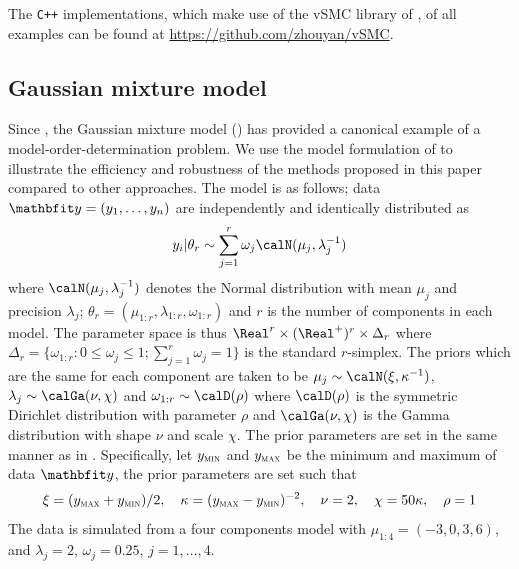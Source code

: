 The \texttt{C++} implementations, which make use of the vSMC library of
\cite{vsmcjss}, of all examples can be found at
\url{https://github.com/zhouyan/vSMC}.

\subsection{Gaussian mixture model}
\label{sub:Gaussian mixture model}

Since \cite{Richardson:1997ea}, the Gaussian mixture model (\gmm) has
provided a canonical example of a model-order-determination problem. We use
the model formulation of \cite{DelMoral:2006hc} to illustrate the efficiency
and robustness of the methods proposed in this paper compared to other
approaches. The model is as follows; data $\data = (y_1,\dots,y_n)$ are
independently and identically distributed as
\begin{equation*}
  y_i|\theta_r \sim \sum_{j=1}^r \omega_j\calN(\mu_j,\lambda_j^{-1})
\end{equation*}
where $\calN(\mu_j,\lambda_j^{-1})$ denotes the Normal distribution with mean
$\mu_j$ and precision $\lambda_j$; $\theta_r =
(\mu_{1:r},\lambda_{1:r},\omega_{1:r})$ and $r$ is the number of components in
each model. The parameter space is thus $\Real^r \times (\Real^{+})^r\times
\Delta_r$ where $\Delta_r = \{\omega_{1:r}:0\le\omega_j\le1;
\sum_{j=1}^r\omega_j=1\}$ is the standard $r$-simplex. The priors which are
the same for each component are taken to be $\mu_j\sim\calN(\xi,\kappa^{-1})$,
$\lambda_j\sim\calGa(\nu,\chi)$ and $\omega_{1:r}\sim\calD(\rho)$ where
$\calD(\rho)$ is the symmetric Dirichlet distribution with parameter $\rho$
and $\calGa(\nu,\chi)$ is the Gamma distribution with shape $\nu$ and scale
$\chi$. The prior parameters are set in the same manner as in
\cite{Richardson:1997ea}. Specifically, let $y_{\text{\textsc{min}}}$ and
$y_{\text{\textsc{max}}}$ be the minimum and maximum of data $\data$, the
prior parameters are set such that
\begin{equation*}
  \xi = (y_{\text{\textsc{max}}} + y_{\text{\textsc{min}}}) / 2, \quad
  \kappa = (y_{\text{\textsc{max}}} - y_{\text{\textsc{min}}})^{-2}, \quad
  \nu = 2, \quad \chi = 50\kappa, \quad \rho = 1
\end{equation*}
The data is simulated from a four components model with $\mu_{1:4} = (-3, 0,3,
6)$, and $\lambda_j =2$, $\omega_j = 0.25$, $j = 1,\dots,4$.

